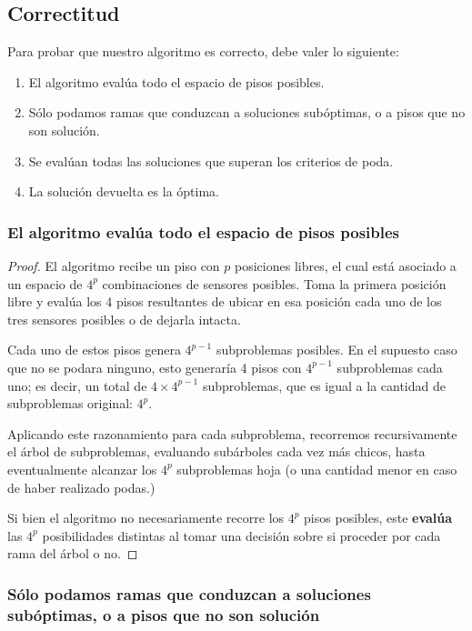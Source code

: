 \documentclass[a4paper, 10pt, twoside]{article}
\begin{document}
\subsection{Correctitud}

Para probar que nuestro algoritmo es correcto, debe valer lo siguiente:

\begin{enumerate}
    \item{El algoritmo evalúa todo el espacio de pisos posibles.}
    \item{Sólo podamos ramas que conduzcan a soluciones subóptimas, o a pisos que no son solución.}
    \item{Se evalúan todas las soluciones que superan los criterios de poda.}
    \item{La solución devuelta es la óptima.}
\end{enumerate}


\subsubsection{El algoritmo evalúa todo el espacio de pisos posibles}

\begin{proof}
    El algoritmo recibe un piso con $p$ posiciones libres, el cual está asociado a un espacio de $4^p$ combinaciones de sensores posibles. Toma la primera posición libre y evalúa los 4 pisos resultantes de ubicar en esa posición cada uno de los tres sensores posibles o de dejarla intacta.

    Cada uno de estos pisos genera $4^{p-1}$ subproblemas posibles. En el supuesto caso que no se podara ninguno, esto generaría 4 pisos con $4^{p-1}$ subproblemas cada uno; es decir, un total de $4 \times 4^{p-1}$ subproblemas, que es igual a la cantidad de subproblemas original: $4^p$.

    Aplicando este razonamiento para cada subproblema, recorremos recursivamente el árbol de subproblemas, evaluando subárboles cada vez más chicos, hasta eventualmente alcanzar los $4^p$ subproblemas hoja (o una cantidad menor en caso de haber realizado podas.)

    Si bien el algoritmo no necesariamente recorre los $4^p$ pisos posibles, este \textbf{evalúa} las $4^p$ posibilidades distintas al tomar una decisión sobre si proceder por cada rama del árbol o no.
\end{proof}


\subsubsection{Sólo podamos ramas que conduzcan a soluciones subóptimas, o a pisos que no son solución}
\end{document}
